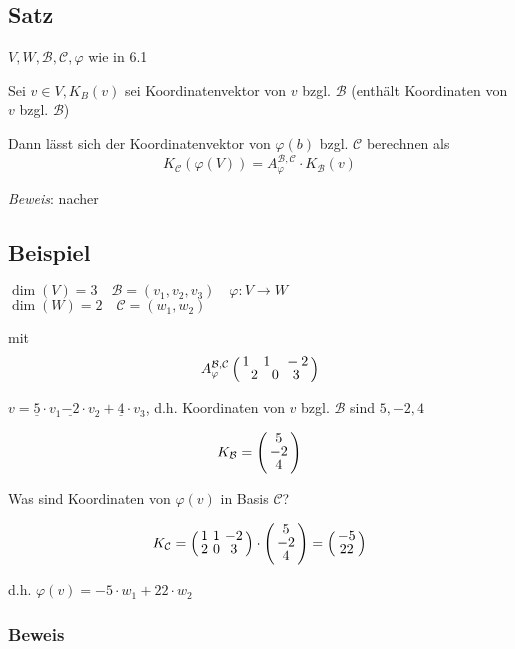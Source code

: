 \subsection{Satz}

$V,W,\mathcal{B},\mathcal{C},\varphi$ wie in 6.1\bigskip

Sei $v \in V,K_B(v)$ sei Koordinatenvektor von $v$ bzgl. $\mathcal{B}$ (enthält Koordinaten von $v$ bzgl. $\mathcal{B}$)

Dann lässt sich der Koordinatenvektor von $\varphi(b)$ bzgl. $\mathcal{C}$ berechnen als
\[K_\mathcal{C}(\varphi(V)) = A_\varphi^{\mathcal{B},\mathcal{C}} \cdot K_\mathcal{B}(v)\]

\emph{Beweis}: nacher

\subsection{Beispiel}

$\dim(V) = 3 \quad \mathcal{B} = (v_1,v_2,v_3) \quad \varphi: V \rightarrow W$\\
$\dim(W) = 2 \quad \mathcal{C} = (w_1,w_2)$

mit
\[A_\varphi^{\mathcal{B},\mathcal{C}} \weirdvct{1\quad1\quad-2}{2\quad0\quad3}\]

$v = \underline{5}\cdot v_1 \underline{-2} \cdot v_2 +\underline{4} \cdot v_3$, d.h. Koordinaten von $v$ bzgl. $\mathcal{B}$ sind $5,-2,4$

\[K_\mathcal{B} =
\aMatrix{c}
{5\\-2\\4}
\]

Was sind Koordinaten von $\varphi(v)$ in Basis $\mathcal{C}$?

\[
K_\mathcal{C} = \aMatrix{ccc}{1 & 1 & -2 \\ 2 & 0 & 3}\cdot
\aMatrix{c}{5\\-2\\4}= \weirdvct{-5}{22}
\]

d.h. $\varphi(v) = -5 \cdot w_1 + 22 \cdot w_2$\bigskip

\subsubsection*{Beweis}

